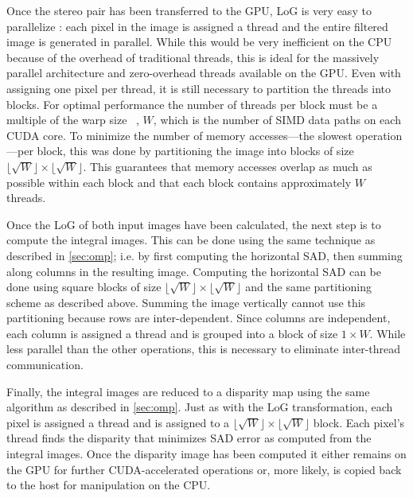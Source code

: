\documentclass{article}
\let\orgautoref\autoref
\providecommand{\Cref}
        {\def\equationautorefname{Equation}%
         \def\figureautorefname{Figure}%
         \def\subfigureautorefname{Figure}%
         \def\Itemautorefname{Item}%
         \def\tableautorefname{Table}%
         \def\sectionautorefname{Section}%
         \def\subsectionautorefname{Section}%
         \def\subsubsectionautorefname{Section}%
         \def\chapterautorefname{Section}%
         \def\partautorefname{Part}%
         \orgautoref}
\newcommand{\floor}[1]{\lfloor#1\rfloor}
\begin{document}
Once the stereo pair has been transferred to the GPU, LoG is very easy to
parallelize : each pixel in the image is assigned a thread and the entire
filtered image is generated in parallel. While this would be very inefficient
on the CPU because of the overhead of traditional threads, this is ideal for
the massively parallel architecture and zero-overhead threads available on the
GPU. Even with assigning one pixel per thread, it is still necessary to
partition the threads into blocks. For optimal performance the number of
threads per block must be a multiple of the warp size ~\cite{cuda}, $W$, which
is the number of SIMD data paths on each CUDA core. To minimize the number of
memory accesses---the slowest operation---per block, this was done by
partitioning the image into blocks of size $\floor{\sqrt{W}} \times
\floor{\sqrt{W}}$. This guarantees that memory accesses overlap as much as possible within each block and that each block contains approximately $W$ threads.

Once the LoG of both input images have been calculated, the next step is to
compute the integral images. This can be done using the same technique as
described in \Cref{sec:omp}; i.e. by first computing the horizontal SAD, then
summing along columns in the resulting image. Computing the horizontal SAD can
be done using square blocks of size $\floor{\sqrt{W}} \times \floor{\sqrt{W}}$
and the same partitioning scheme as described above. Summing the image
vertically cannot use this partitioning because rows are inter-dependent. Since
columns are independent, each column is assigned a thread and is grouped into a
block of size $1 \times W$. While less parallel than the other operations, this
is necessary to eliminate inter-thread communication.

Finally, the integral images are reduced to a disparity map using the same
algorithm as described in \Cref{sec:omp}. Just as with the LoG transformation,
each pixel is assigned a thread and is assigned to a $\floor{\sqrt{W}} \times
\floor{\sqrt{W}}$ block. Each pixel's thread finds the disparity that minimizes
SAD error as computed from the integral images. Once the disparity image has
been computed it either remains on the GPU for further CUDA-accelerated
operations or, more likely, is copied back to the host for manipulation on the
CPU.
\end{document}
